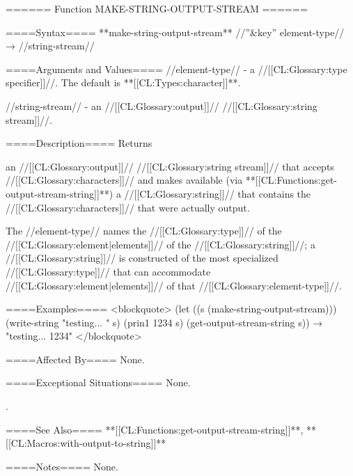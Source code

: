 ====== Function MAKE-STRING-OUTPUT-STREAM ======

====Syntax====
**make-string-output-stream** //''&key'' element-type// → //string-stream//

====Arguments and Values====
//element-type// - a //[[CL:Glossary:type specifier]]//. The default is **[[CL:Types:character]]**.

//string-stream// - an //[[CL:Glossary:output]]// //[[CL:Glossary:string stream]]//.

====Description====
Returns

an //[[CL:Glossary:output]]// //[[CL:Glossary:string stream]]// that accepts //[[CL:Glossary:characters]]// and makes available (via **[[CL:Functions:get-output-stream-string]]**) a //[[CL:Glossary:string]]// that contains the //[[CL:Glossary:characters]]// that were actually output.

The //element-type// names the //[[CL:Glossary:type]]// of the //[[CL:Glossary:element|elements]]// of the //[[CL:Glossary:string]]//; a //[[CL:Glossary:string]]// is constructed of the most specialized //[[CL:Glossary:type]]// that can accommodate //[[CL:Glossary:element|elements]]// of that //[[CL:Glossary:element-type]]//.

====Examples====
<blockquote> (let ((s (make-string-output-stream))) (write-string "testing... " s) (prin1 1234 s) (get-output-stream-string s)) → "testing... 1234" </blockquote>

====Affected By====
None.

====Exceptional Situations====
None.

\None.

====See Also====
**[[CL:Functions:get-output-stream-string]]**, **[[CL:Macros:with-output-to-string]]**

====Notes====
None.

  
